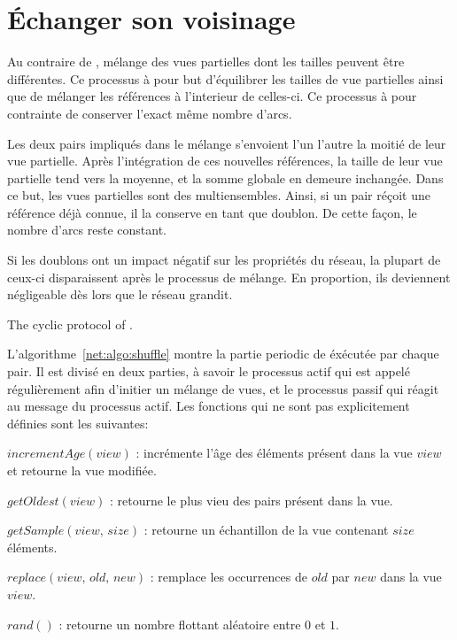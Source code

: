 
\section{Échanger son voisinage}

Au contraire de \CYCLON, \SPRAY mélange des vues partielles dont les tailles
peuvent être différentes. Ce processus à pour but d'équilibrer les tailles de
vue partielles ainsi que de mélanger les références à l'interieur de celles-ci.
Ce processus à pour contrainte de conserver l'exact même nombre d'arcs.

Les deux pairs impliqués dans le mélange s'envoient l'un l'autre la moitié de
leur vue partielle. Après l'intégration de ces nouvelles références, la taille
de leur vue partielle tend vers la moyenne, et la somme globale en demeure
inchangée. Dans ce but, les vues partielles sont des multiensembles. Ainsi, si
un pair réçoit une référence déjà connue, il la conserve en tant que doublon.
De cette façon, le nombre d'arcs reste constant.

Si les doublons ont un impact négatif sur les propriétés du réseau, la plupart
de ceux-ci disparaissent après le processus de mélange. En proportion, ils
deviennent négligeable dès lors que le réseau grandit.

\begin{algorithm}[h]
  
  \caption{\label{net:algo:shuffle}The cyclic protocol of \SPRAY.}
\end{algorithm}

L'algorithme~\ref{net:algo:shuffle} montre la partie periodic de \SPRAY éxécutée
par chaque pair. Il est divisé en deux parties, à savoir le processus actif qui
est appelé régulièrement afin d'initier un mélange de vues, et le processus
passif qui réagit au message du processus actif. Les fonctions qui ne sont pas
explicitement définies sont les suivantes:
\begin{compactitem}
\item $incrementAge(view)$ : incrémente l'âge des éléments présent dans la vue
  $view$ et retourne la vue modifiée.
\item $getOldest(view)$ : retourne le plus vieu des pairs présent dans la vue.
\item $getSample(view,\, size)$ : retourne un échantillon de la vue contenant $size$
  éléments.
\item $replace(view,\,old,\,new)$ : remplace les occurrences de $old$ par $new$ dans
  la vue $view$.
\item $rand()$ : retourne un nombre flottant aléatoire entre $0$ et $1$.
\end{compactitem}

